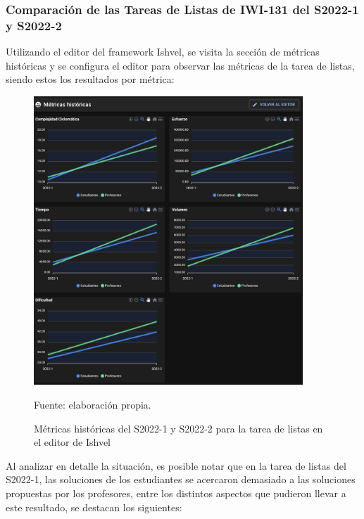 \documentclass[letterpaper,12pt]{article}
\begin{document}
\subsubsection{Comparación de las Tareas de Listas de IWI-131 del S2022-1 y S2022-2}

Utilizando el editor del framework Ishvel, se visita la sección de métricas históricas y se configura el editor para observar las métricas de la tarea de listas, siendo estos los resultados por métrica:
\begin{figure}[H]
  \centering
  \includegraphics[width=0.9\textwidth]{figures/metricstList.png}
  \caption{Métricas históricas del S2022-1 y S2022-2 para la tarea de listas en el editor de Ishvel} Fuente: elaboración propia.
  \label{img:metricstList}
\end{figure}
Al analizar en detalle la situación, es posible notar que en la tarea de listas del S2022-1, las soluciones de los estudiantes se acercaron demasiado a las soluciones propuestas por los profesores, entre los distintos aspectos que pudieron llevar a este resultado, se destacan los siguientes:
\end{document}
